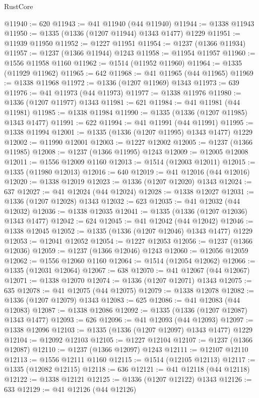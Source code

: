 \begin{lexlean}{RustCore}
\begin{coremodule}
@11940 := 620
@11943 := @41 @11940 (@44 @11940)
@11944 := @1338 @11943
@11950 := @1335 (@1336 (@1207 @11944) @1343 @1477) @1229
@11951 := @11939 @11950
@11952 := @1227 @11951
@11954 := @1237 (@1366 @11934)
@11957 := @1237 (@1366 @11944) @1243
@11958 := @11954 @11957
@11960 := @1556 @11958 @1160
@11962 := @1514 (@11952 @11960)
@11964 := @1335 (@11929 @11962)
@11965 := 642
@11968 := @41 @11965 (@44 @11965)
@11969 := @1338 @11968
@11972 := @1336 (@1207 @11969) @1343
@11973 := 639
@11976 := @41 @11973 (@44 @11973)
@11977 := @1338 @11976
@11980 := @1336 (@1207 @11977) @1343
@11981 := 621
@11984 := @41 @11981 (@44 @11981)
@11985 := @1338 @11984
@11990 := @1335 (@1336 (@1207 @11985) @1343 @1477)
@11991 := 622
@11994 := @41 @11991 (@44 @11991)
@11995 := @1338 @11994
@12001 := @1335 (@1336 (@1207 @11995) @1343 @1477) @1229
@12002 := @11990 @12001
@12003 := @1227 @12002
@12005 := @1237 (@1366 @11985)
@12008 := @1237 (@1366 @11995) @1243
@12009 := @12005 @12008
@12011 := @1556 @12009 @1160
@12013 := @1514 (@12003 @12011)
@12015 := @1335 (@11980 @12013)
@12016 := 640
@12019 := @41 @12016 (@44 @12016)
@12020 := @1338 @12019
@12023 := @1336 (@1207 @12020) @1343
@12024 := 637
@12027 := @41 @12024 (@44 @12024)
@12028 := @1338 @12027
@12031 := @1336 (@1207 @12028) @1343
@12032 := 623
@12035 := @41 @12032 (@44 @12032)
@12036 := @1338 @12035
@12041 := @1335 (@1336 (@1207 @12036) @1343 @1477)
@12042 := 624
@12045 := @41 @12042 (@44 @12042)
@12046 := @1338 @12045
@12052 := @1335 (@1336 (@1207 @12046) @1343 @1477) @1229
@12053 := @12041 @12052
@12054 := @1227 @12053
@12056 := @1237 (@1366 @12036)
@12059 := @1237 (@1366 @12046) @1243
@12060 := @12056 @12059
@12062 := @1556 @12060 @1160
@12064 := @1514 (@12054 @12062)
@12066 := @1335 (@12031 @12064)
@12067 := 638
@12070 := @41 @12067 (@44 @12067)
@12071 := @1338 @12070
@12074 := @1336 (@1207 @12071) @1343
@12075 := 635
@12078 := @41 @12075 (@44 @12075)
@12079 := @1338 @12078
@12082 := @1336 (@1207 @12079) @1343
@12083 := 625
@12086 := @41 @12083 (@44 @12083)
@12087 := @1338 @12086
@12092 := @1335 (@1336 (@1207 @12087) @1343 @1477)
@12093 := 626
@12096 := @41 @12093 (@44 @12093)
@12097 := @1338 @12096
@12103 := @1335 (@1336 (@1207 @12097) @1343 @1477) @1229
@12104 := @12092 @12103
@12105 := @1227 @12104
@12107 := @1237 (@1366 @12087)
@12110 := @1237 (@1366 @12097) @1243
@12111 := @12107 @12110
@12113 := @1556 @12111 @1160
@12115 := @1514 (@12105 @12113)
@12117 := @1335 (@12082 @12115)
@12118 := 636
@12121 := @41 @12118 (@44 @12118)
@12122 := @1338 @12121
@12125 := @1336 (@1207 @12122) @1343
@12126 := 633
@12129 := @41 @12126 (@44 @12126)

\end{coremodule}
\end{lexlean}
